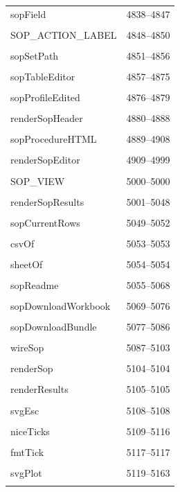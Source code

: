 {\begin{longtable}{@{}p{11cm}r@{}}
sopField & 4838--4847 \\\\\hline
SOP\_ACTION\_LABEL & 4848--4850 \\\\\hline
sopSetPath & 4851--4856 \\\\\hline
sopTableEditor & 4857--4875 \\\\\hline
sopProfileEdited & 4876--4879 \\\\\hline
renderSopHeader & 4880--4888 \\\\\hline
sopProcedureHTML & 4889--4908 \\\\\hline
renderSopEditor & 4909--4999 \\\\\hline
SOP\_VIEW & 5000--5000 \\\\\hline
renderSopResults & 5001--5048 \\\\\hline
sopCurrentRows & 5049--5052 \\\\\hline
csvOf & 5053--5053 \\\\\hline
sheetOf & 5054--5054 \\\\\hline
sopReadme & 5055--5068 \\\\\hline
sopDownloadWorkbook & 5069--5076 \\\\\hline
sopDownloadBundle & 5077--5086 \\\\\hline
wireSop & 5087--5103 \\\\\hline
renderSop & 5104--5104 \\\\\hline
renderResults & 5105--5105 \\\\\hline
svgEsc & 5108--5108 \\\\\hline
niceTicks & 5109--5116 \\\\\hline
fmtTick & 5117--5117 \\\\\hline
svgPlot & 5119--5163 \\\\\hline

\end{longtable}}

